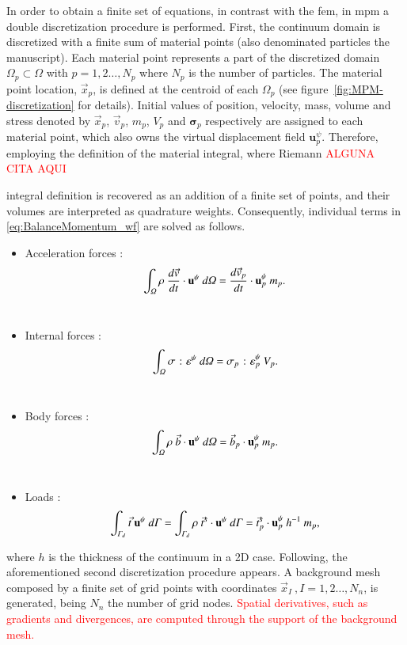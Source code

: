 \documentclass[preprint,12pt,a4paper]{elsarticle}
\newcommand{\vect}[1]{
  \ensuremath{\mathbf{{#1}}}
}
\newcommand{\tens}[1]{
  \ensuremath{\mathbf{{#1}}}
}
\newcommand{\red}[1]{
  \textcolor{red}{{#1}}
}
\newcommand{\Integral}[2]{
  \IfStrEqCase{#1}{
    {2}{\ensuremath{\int_{\varGamma_d}{#2}\ d\varGamma}}
    {3}{\ensuremath{\int_{\varOmega}{#2}\ d\varOmega}}
  }
}
\begin{document}
In order to obtain a finite set of equations, in contrast with the
\acrshort{fem}, in \acrshort{mpm} a double discretization procedure is
performed. First, the continuum \gls{domain} is discretized with a finite sum of material points (also denominated particles the manuscript). Each material point
represents a part of the discretized domain $\varOmega_p \subset
\varOmega$ with $p = 1,2\ldots ,N_p$ where $N_p$ is the number of
particles. The material point location, $\vec{x}_p$, is defined at the centroid
of each $\Omega_p$ (see figure~\ref{fig:MPM-discretization} for details).
Initial values of position,
velocity, mass, volume and stress denoted by $\vec{x}_p$,
$\vec{v}_p$, $m_p$,  $V_p$ and $\tens{\sigma}_p$ respectively are assigned to each material point, which also owns the
virtual displacement field $\vect{u}^{\psi}_{p}$. Therefore, employing
the definition of the material integral, where Riemann \red{ALGUNA CITA AQUI}
integral definition is recovered as an addition of a finite set of points, and
their volumes are interpreted as quadrature weights. Consequently,
individual terms in \eqref{eq:BalanceMomentum_wf} are solved as follows. 
\begin{itemize}
\item Acceleration forces :
\begin{equation}
    \label{eq:particle_acceleration_forces}
    \Integral{3}{\rho\ \frac{d\vec{v}}{dt} \cdot \vect{u}^{\psi}} =
    \frac{d\vec{v}_{p}}{dt} \cdot \vect{u}^{\psi}_{p}\ m_p.
  \end{equation}\\
\item Internal forces :
  \begin{equation}
    \label{eq:particle_internal_forces}
    \Integral{3}{\tens{\sigma}\ \colon \tens{\varepsilon}^{\psi}} =
   \tens{\sigma}_{p}\ \colon \tens{\varepsilon}^{\psi}_p \ V_p.
  \end{equation}\\
\item Body forces :
\begin{equation}
  \label{eq:particle_body_forces}
  \Integral{3}{\rho\ \vec{b} \cdot \vect{u}^{\psi} } = 
  \vec{b}_{p} \cdot \vect{u}^{\psi}_p\ m_p.
\end{equation}\\
\item Loads :
\begin{equation}
  \begin{aligned}
    \label{eq:particle_load_forces}
    \Integral{2}{\vec{t}\ \vect{u}^{\psi}} = \Integral{2}{\rho\
      \vec{t}^s \cdot \vect{u}^{\psi}} = \vec{t}^s_{p} \cdot \vect{u}^{\psi}_{p}\ h^{-1}\ m_p ,
  \end{aligned} 
\end{equation}
\end{itemize}
where $h$ is the thickness of the continuum in a 2D case. Following, the aforementioned second discretization procedure appears. A background mesh
composed by a finite set of grid points with coordinates $\vec{x}_I\
, I = 1,2\ldots ,N_n$, is generated, being $N_n$ the number of grid
nodes. \red{Spatial derivatives, such as gradients and
divergences, are computed through the support of the background mesh.}
\end{document}
